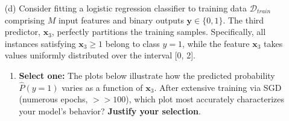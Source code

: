 \documentclass[11pt,addpoints,answers]{exam}
\newcommand{\xv}{\mathbf{x}}
\newcommand{\yv}{\mathbf{y}}
\newcommand{\sone}{\textbf{Select one: }}
\begin{document}
\begin{enumerate}
\begin{enumerate}[label=\alph*), itemsep=10pt]
			\vspace*{1.2cm}
			
			\item[(d)] Consider fitting a logistic regression classifier to training data $\mathcal{D}_{train}$ comprising $M$ input features and binary outputs $\yv \in \{0, 1\}$. The third predictor, $\xv_3$, perfectly partitions the training samples. Specifically, all instances satisfying $\xv_3 \geq 1$ belong to class $y=1$, while the feature $\xv_3$ takes values uniformly distributed over the interval [0, 2].
			
			\begin{enumerate}[label=(\roman*), leftmargin=*]
				
				\item \sone
				The plots below illustrate how the predicted probability $\hat{P}(y=1)$ varies as a function of $\xv_3$. After extensive training via SGD (numerous epochs, $>>100$), which plot most accurately characterizes your model's behavior? \textbf{Justify your selection}.
				

\end{enumerate}
\end{enumerate}
\end{enumerate}
\end{document}
